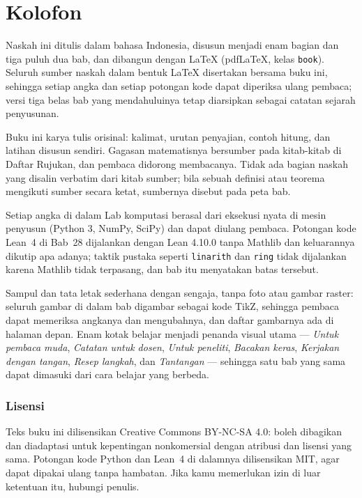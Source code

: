 \chapter*{Kolofon}

Naskah ini ditulis dalam bahasa Indonesia, disusun menjadi enam bagian dan tiga puluh
dua bab, dan dibangun dengan \LaTeX{} (pdf\LaTeX{}, kelas \texttt{book}). Seluruh
sumber naskah dalam bentuk \LaTeX{} disertakan bersama buku ini, sehingga setiap angka
dan setiap potongan kode dapat diperiksa ulang pembaca; versi tiga belas bab yang
mendahuluinya tetap diarsipkan sebagai catatan sejarah penyusunan.

Buku ini karya tulis orisinal: kalimat, urutan penyajian, contoh hitung, dan latihan
disusun sendiri. Gagasan matematisnya bersumber pada kitab-kitab di Daftar Rujukan,
dan pembaca didorong membacanya. Tidak ada bagian naskah yang disalin verbatim dari
kitab sumber; bila sebuah definisi atau teorema mengikuti sumber secara ketat,
sumbernya disebut pada peta bab.

Setiap angka di dalam Lab komputasi berasal dari eksekusi nyata di mesin penyusun
(Python 3, NumPy, SciPy) dan dapat diulang pembaca. Potongan kode Lean~4 di Bab~28
dijalankan dengan Lean 4.10.0 tanpa Mathlib dan keluarannya dikutip apa adanya;
taktik pustaka seperti \texttt{linarith} dan \texttt{ring} tidak dijalankan karena
Mathlib tidak terpasang, dan bab itu menyatakan batas tersebut.

Sampul dan tata letak sederhana dengan sengaja, tanpa foto atau gambar raster: seluruh
gambar di dalam bab digambar sebagai kode TikZ, sehingga pembaca dapat memeriksa
angkanya dan mengubahnya, dan daftar gambarnya ada di halaman depan. Enam kotak
belajar menjadi penanda visual utama --- \emph{Untuk pembaca muda}, \emph{Catatan untuk
dosen}, \emph{Untuk peneliti}, \emph{Bacakan keras}, \emph{Kerjakan dengan tangan},
\emph{Resep langkah}, dan \emph{Tantangan} --- sehingga satu bab yang sama dapat
dimasuki dari cara belajar yang berbeda.

\subsection*{Lisensi}
Teks buku ini dilisensikan Creative Commons BY-NC-SA 4.0: boleh dibagikan dan
diadaptasi untuk kepentingan nonkomersial dengan atribusi dan lisensi yang sama.
Potongan kode Python dan Lean~4 di dalamnya dilisensikan MIT, agar dapat dipakai ulang
tanpa hambatan. Jika kamu memerlukan izin di luar ketentuan itu, hubungi penulis.

